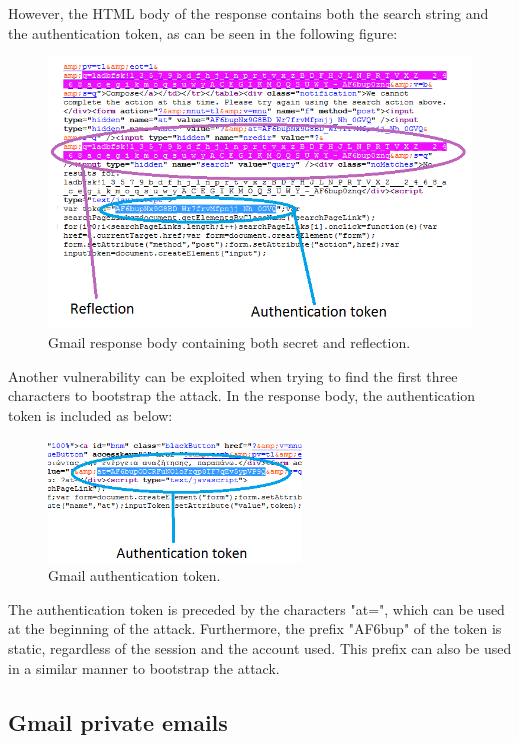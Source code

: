 However, the HTML body of the response contains both the search string and the
authentication token, as can be seen in the following figure:

\begin{figure}[H] \caption{Gmail response body containing both secret and
reflection.} \centering
\includegraphics[width=1\textwidth]{diagrams/gmail_response.png}\end{figure}

Another vulnerability can be exploited when trying to find the first three
characters to bootstrap the attack. In the response body, the authentication
token is included as below:

\begin{figure}[H] \caption{Gmail authentication token.} \centering
\includegraphics[width=0.6\textwidth]{diagrams/gmail_bootstrap.png}\end{figure}

The authentication token is preceded by the characters "at=", which can be used
at the beginning of the attack. Furthermore, the prefix "AF6bup" of the token is
static, regardless of the session and the account used. This prefix can also be
used in a similar manner to bootstrap the attack.

\subsection{Gmail private emails}

